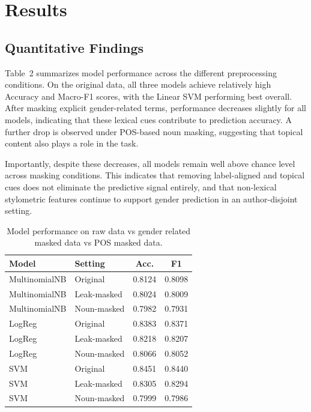 \documentclass[11pt]{article}
\begin{document}
\section{Results}

\subsection{Quantitative Findings}

Table~2 summarizes model performance across the different preprocessing
conditions. On the original data, all three models achieve relatively high
Accuracy and Macro-F1 scores, with the Linear SVM performing best overall.
After masking explicit gender-related terms, performance decreases slightly
for all models, indicating that these lexical cues contribute to prediction
accuracy. A further drop is observed under POS-based noun masking, suggesting
that topical content also plays a role in the task.

Importantly, despite these decreases, all models remain well above chance
level across masking conditions. This indicates that removing label-aligned
and topical cues does not eliminate the predictive signal entirely, and that
non-lexical stylometric features continue to support gender prediction in an
author-disjoint setting.


\begin{table}[h]
\centering
\begin{tabular}{llcc}
\toprule
\textbf{Model} & \textbf{Setting} & \textbf{Acc.} & \textbf{F1} \\
\midrule
MultinomialNB & Original       & 0.8124 & 0.8098 \\
MultinomialNB & Leak-masked    & 0.8024 & 0.8009 \\
MultinomialNB & Noun-masked    & 0.7982 & 0.7931 \\
LogReg        & Original       & 0.8383 & 0.8371 \\
LogReg        & Leak-masked    & 0.8218 & 0.8207 \\
LogReg        & Noun-masked    & 0.8066 & 0.8052 \\
SVM           & Original       & 0.8451 & 0.8440 \\
SVM           & Leak-masked    & 0.8305 & 0.8294 \\
SVM           & Noun-masked    & 0.7999 & 0.7986 \\
\bottomrule
\end{tabular}
\caption{Model performance on raw data vs gender related masked data vs POS masked data.}
\label{tab:model_metrics}
\end{table}
\end{document}
